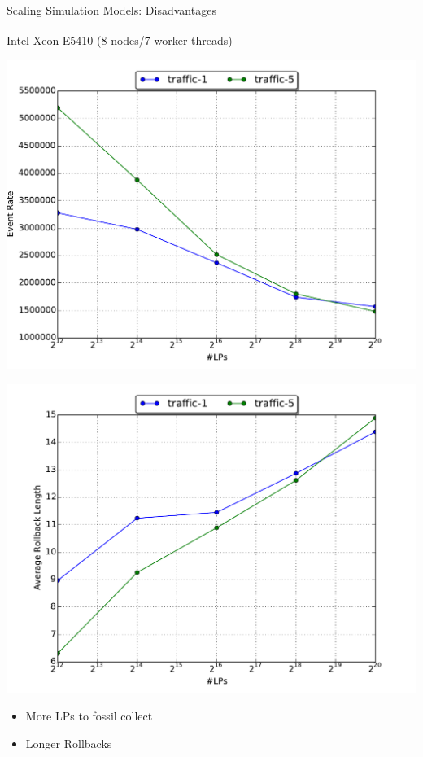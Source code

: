 \documentclass[10pt]{beamer}
\begin{document}
\begin{frame}{Scaling Simulation Models: Disadvantages}
    \begin{block}{Intel\textsuperscript{\textregistered} Xeon\textsuperscript{\textregistered}
        E5410 (8 nodes/7 worker threads)}\end{block}
    \begin{minipage}{0.5\textwidth}
        \includegraphics[width=\textwidth]{../figs/scale/scale_event_rate_traffic.pdf}
    \end{minipage}%
    \begin{minipage}{0.5\textwidth}
        \includegraphics[width=\textwidth]{../figs/scale/scale_arl_traffic.pdf}
    \end{minipage}
    \begin{itemize}
        \item More LPs to fossil collect
        \item Longer Rollbacks
    \end{itemize}
\end{frame}
\end{document}
